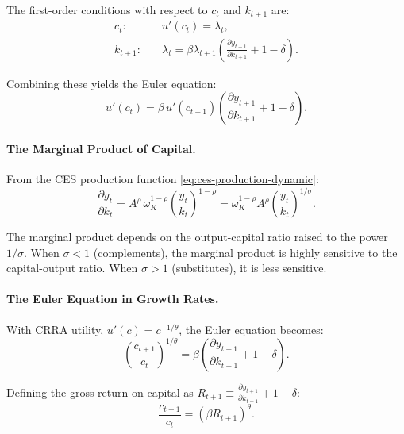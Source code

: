 The first-order conditions with respect to $c_t$ and $k_{t+1}$ are:
\begin{align}
c_t: \quad & u'(c_t) = \lambda_t, \label{eq:foc-c} \\[4pt]
k_{t+1}: \quad & \lambda_t = \beta \lambda_{t+1} \left( \frac{\partial y_{t+1}}{\partial k_{t+1}} + 1 - \delta \right). \label{eq:foc-k}
\end{align}

Combining these yields the Euler equation:
\begin{equation}
\boxed{u'(c_t) = \beta \, u'(c_{t+1}) \left( \frac{\partial y_{t+1}}{\partial k_{t+1}} + 1 - \delta \right).}
\label{eq:euler-equation}
\end{equation}

\paragraph{The Marginal Product of Capital.}
From the CES production function \cref{eq:ces-production-dynamic}:
\begin{equation}
\frac{\partial y_t}{\partial k_t} = A^\rho \, \omega_K^{1-\rho} \left( \frac{y_t}{k_t} \right)^{1-\rho} = \omega_K^{1-\rho} A^\rho \left( \frac{y_t}{k_t} \right)^{1/\sigma}.
\label{eq:mpk-dynamic}
\end{equation}

The marginal product depends on the output-capital ratio raised to the power $1/\sigma$. When $\sigma < 1$ (complements), the marginal product is highly sensitive to the capital-output ratio. When $\sigma > 1$ (substitutes), it is less sensitive.

\paragraph{The Euler Equation in Growth Rates.}
With CRRA utility, $u'(c) = c^{-1/\theta}$, the Euler equation becomes:
\begin{equation}
\left( \frac{c_{t+1}}{c_t} \right)^{1/\theta} = \beta \left( \frac{\partial y_{t+1}}{\partial k_{t+1}} + 1 - \delta \right).
\label{eq:euler-growth}
\end{equation}

Defining the gross return on capital as $R_{t+1} \equiv \frac{\partial y_{t+1}}{\partial k_{t+1}} + 1 - \delta$:
\begin{equation}
\frac{c_{t+1}}{c_t} = \left( \beta R_{t+1} \right)^\theta.
\label{eq:consumption-growth}
\end{equation}

